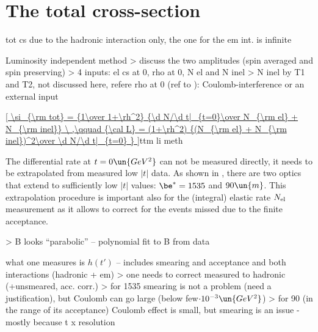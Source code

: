 \bmfig
{}
\emfig







\iffalse

\section{The total cross-section}

\> tot cs due to the hadronic interaction only, the one for the em int. is infinite

\> Luminosity independent method
\>> discuss the two amplitudes (spin averaged and spin preserving)
\>> 4 inputs: el cs at 0, rho at 0, N el and N inel
\>> N inel by T1 and T2, not discussed here, refere
\> rho at 0 (ref to ): Coulomb-interference or an external input

\eqref{
	\si_{\rm tot} = {1\over 1+\rh^2} {\d N/\d t|_{t=0}\over N_{\rm el} + N_{\rm inel}}
	\ ,\qquad
	{\cal L} = (1+\rh^2) {(N_{\rm el} + N_{\rm inel})^2\over \d N/\d t|_{t=0} }
}{ttm li meth}

The differential rate at $t=0\un{GeV^2}$ can not be measured directly, it needs to be extrapolated from measured low $|t|$ data. As shown in , there are two optics that extend to sufficiently low $|t|$ values: $\be^* = 1535$ and $90\un{m}$. This extrapolation procedure is important also for the (integral) elastic rate $N_{\rm el}$ measurement as it allows to correct for the events missed due to the finite acceptance.


\>> B looks ``parabolic'' -- polynomial fit to B from data

\iffalse
islam_bfkl, 9E-01, 3E-01, 2E-02, 1E-03, 3E-04
 islam_cgc, 9E-01, 3E-01, 2E-02, 1E-03, 3E-04
      ppp2, 6E-02, 4E-03, 1E-04, 3E-06, 1E-06
      ppp3, 8E-01, 2E-01, 4E-03, 4E-03, 2E-03
       bsw, 5E-01, 2E-01, 1E-03, 2E-04, 2E-04
        bh, 2E+00, 3E-01, 7E-03, 3E-03, 2E-03
      mean, 8E-01, 2E-01, 8E-03, 1E-03, 8E-04
\fi


\> what one measures is $h(t')$ -- includes smearing and acceptance and both interactions (hadronic + em)
\>> one needs to correct measured to hadronic (+unsmeared, acc. corr.)
\>> for 1535 smearing is not a problem (need a justification), but Coulomb can go large (below few$\cdot 10^{-3}\un{GeV^2}$)
\>> for 90 (in the range of its acceptance) Coulomb effect is small, but smearing is an issue - mostly because t x resolution

